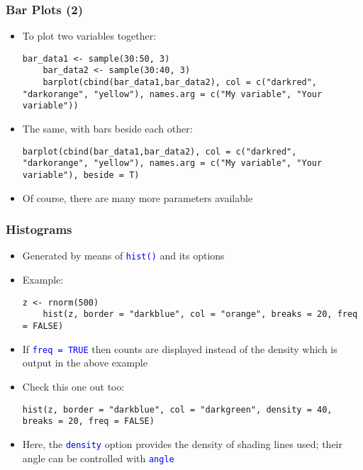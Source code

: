 \documentclass[10pt]{beamer}
\newcommand{\cc}[1]{\texttt{\textcolor{blue}{#1}}}
\theoremstyle{definition}
\begin{document}
\begin{frame}[fragile]
\frametitle{Bar Plots (2)}
\begin{itemize}
	\item To plot two variables together:
	\begin{lstlisting}[style = rstyle, breaklines]
	bar_data1 <- sample(30:50, 3)
	bar_data2 <- sample(30:40, 3)
	barplot(cbind(bar_data1,bar_data2), col = c("darkred", "darkorange", "yellow"), names.arg = c("My variable", "Your variable"))
	\end{lstlisting}
	\item The same, with bars beside each other:
	\begin{lstlisting}[style = rstyle, breaklines]
	barplot(cbind(bar_data1,bar_data2), col = c("darkred", "darkorange", "yellow"), names.arg = c("My variable", "Your variable"), beside = T)		
	\end{lstlisting}
	\item Of course, there are many more parameters available
\end{itemize}
\end{frame}

\begin{frame}[fragile]
\frametitle{Histograms}
\begin{itemize}
	\item Generated by means of \cc{hist()} and its options
	\item Example:
	\begin{lstlisting}[style = rstyle, breaklines]
	z <- rnorm(500)
	hist(z, border = "darkblue", col = "orange", breaks = 20, freq = FALSE)
	\end{lstlisting}
	\item If \cc{freq = TRUE} then counts are displayed instead of the density which is output in the above example
	\item Check this one out too:
	\begin{lstlisting}[style = rstyle, breaklines]
	hist(z, border = "darkblue", col = "darkgreen", density = 40, breaks = 20, freq = FALSE)
	\end{lstlisting}
	\item Here, the \cc{density} option provides the density of shading lines used; their angle can be controlled with \cc{angle}
\end{itemize}
\end{frame}
\end{document}
